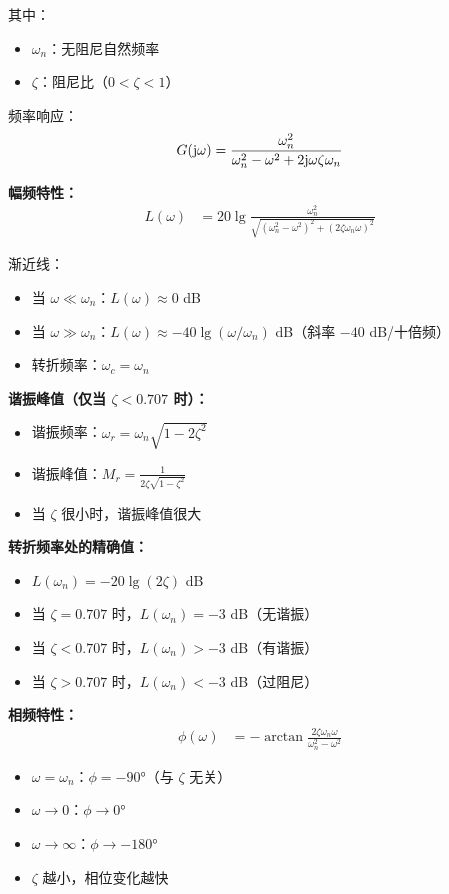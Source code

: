 其中：
\begin{itemize}
    \item $\omega_n$：无阻尼自然频率
    \item $\zeta$：阻尼比（$0 < \zeta < 1$）
\end{itemize}

频率响应：
\begin{align*}
G(\mathrm{j}\omega) = \frac{\omega_n^2}{\omega_n^2 - \omega^2 + 2\mathrm{j}\omega\zeta\omega_n}
\end{align*}

\textbf{幅频特性：}
\begin{align*}
L(\omega) &= 20\lg\frac{\omega_n^2}{\sqrt{(\omega_n^2-\omega^2)^2 + (2\zeta\omega_n\omega)^2}}
\end{align*}

渐近线：
\begin{itemize}
    \item 当 $\omega \ll \omega_n$：$L(\omega) \approx 0$ dB
    \item 当 $\omega \gg \omega_n$：$L(\omega) \approx -40\lg(\omega/\omega_n)$ dB（斜率 $-40$ dB/十倍频）
    \item 转折频率：$\omega_c = \omega_n$
\end{itemize}

\textbf{谐振峰值（仅当 $\zeta < 0.707$ 时）：}
\begin{itemize}
    \item 谐振频率：$\omega_r = \omega_n\sqrt{1-2\zeta^2}$
    \item 谐振峰值：$M_r = \frac{1}{2\zeta\sqrt{1-\zeta^2}}$
    \item 当 $\zeta$ 很小时，谐振峰值很大
\end{itemize}

\textbf{转折频率处的精确值：}
\begin{itemize}
    \item $L(\omega_n) = -20\lg(2\zeta)$ dB
    \item 当 $\zeta = 0.707$ 时，$L(\omega_n) = -3$ dB（无谐振）
    \item 当 $\zeta < 0.707$ 时，$L(\omega_n) > -3$ dB（有谐振）
    \item 当 $\zeta > 0.707$ 时，$L(\omega_n) < -3$ dB（过阻尼）
\end{itemize}

\textbf{相频特性：}
\begin{align*}
\phi(\omega) &= -\arctan\frac{2\zeta\omega_n\omega}{\omega_n^2-\omega^2}
\end{align*}
\begin{itemize}
    \item $\omega = \omega_n$：$\phi = -90°$（与 $\zeta$ 无关）
    \item $\omega \to 0$：$\phi \to 0°$
    \item $\omega \to \infty$：$\phi \to -180°$
    \item $\zeta$ 越小，相位变化越快
\end{itemize}

